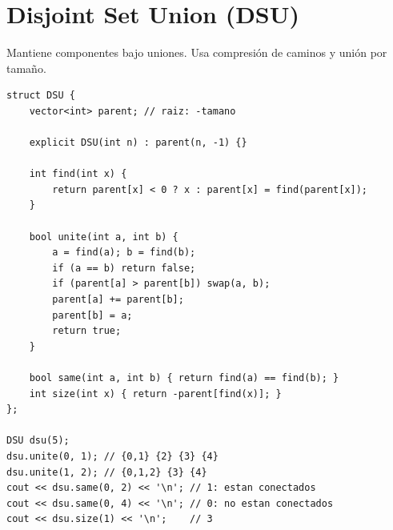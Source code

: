 \section{Disjoint Set Union (DSU)}

Mantiene componentes bajo uniones. Usa compresi\'on de caminos y uni\'on por
tama\~no.


\begin{lstlisting}[style=cpp]
struct DSU {
    vector<int> parent; // raiz: -tamano

    explicit DSU(int n) : parent(n, -1) {}

    int find(int x) {
        return parent[x] < 0 ? x : parent[x] = find(parent[x]);
    }

    bool unite(int a, int b) {
        a = find(a); b = find(b);
        if (a == b) return false;
        if (parent[a] > parent[b]) swap(a, b);
        parent[a] += parent[b];
        parent[b] = a;
        return true;
    }

    bool same(int a, int b) { return find(a) == find(b); }
    int size(int x) { return -parent[find(x)]; }
};

DSU dsu(5);
dsu.unite(0, 1); // {0,1} {2} {3} {4}
dsu.unite(1, 2); // {0,1,2} {3} {4}
cout << dsu.same(0, 2) << '\n'; // 1: estan conectados
cout << dsu.same(0, 4) << '\n'; // 0: no estan conectados
cout << dsu.size(1) << '\n';    // 3
\end{lstlisting}
